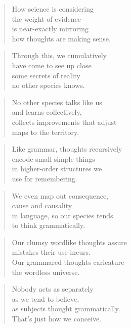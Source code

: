 \documentclass[14pt,a4paper]{article}
\begin{document}
\begin{verse}
How science is considering\\
the weight of evidence\\
is near-exactly mirroring\\
how thoughts are making sense.
\end{verse}

\begin{verse}
Through this, we cumulatively\\
have come to see up close\\
some secrets of reality\\
no other species knows.
\end{verse}

\begin{verse}
No other species talks like us\\
and learns collectively,\\
collects improvements that adjust\\
maps to the territory.
\end{verse}

\begin{verse}
Like grammar, thoughts recursively\\
encode small simple things\\
in higher-order structures we\\
use for remembering.
\end{verse}

\begin{verse}
We even map out consequence,\\
cause and causality\\
in language, so our species tends\\
to think grammatically.
\end{verse}

\begin{verse}
Our clumsy wordlike thoughts assure\\
mistakes their use incurs.\\
Our grammared thoughts caricature\\
the wordless universe.
\end{verse}

\begin{verse}
Nobody acts as separately\\
as we tend to believe,\\
as subjects thought grammatically.\\
That’s just how we conceive.
\end{verse}
\end{document}
